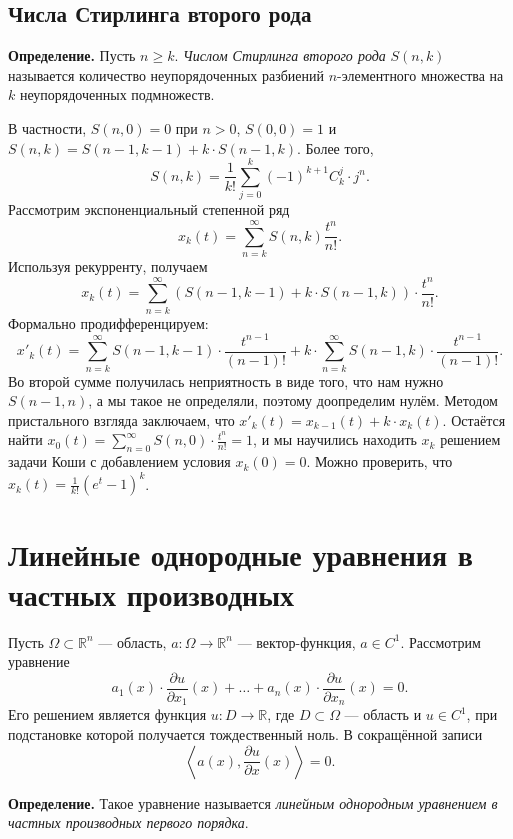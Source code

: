 \subsection{Числа Стирлинга второго рода}
\textbf{Определение.} Пусть $n \ge k$. \textit{Числом Стирлинга второго рода} $S(n, k)$ называется количество неупорядоченных разбиений $n$-элементного множества на $k$ неупорядоченных подмножеств.

В частности, $S(n, 0) = 0$ при $n > 0$, $S(0, 0) = 1$ и $S(n, k) = S(n - 1, k - 1) + k \cdot S(n - 1, k)$.
Более того,
\[
    S(n, k) = \frac{1}{k!} \sum_{j=0}^{k} (-1)^{k+1} C_k^j \cdot j^n.
\]
Рассмотрим экспоненциальный степенной ряд
\[
    x_k(t) = \sum_{n=k}^{\infty} S(n, k) \frac{t^n}{n!}.
\]
Используя рекурренту, получаем
\[
    x_k(t) = \sum_{n=k}^{\infty} (S(n - 1, k - 1) + k \cdot S(n - 1, k)) \cdot \frac{t^n}{n!}.
\]
Формально продифференцируем:
\[
    x'_k(t) = \sum_{n=k}^{\infty} S(n - 1, k - 1) \cdot \frac{t^{n-1}}{(n-1)!} + k \cdot \sum_{n=k}^{\infty} S(n - 1, k) \cdot \frac{t^{n-1}}{(n-1)!}.
\]
Во второй сумме получилась неприятность в виде того, что нам нужно $S(n - 1, n)$, а мы такое не определяли, поэтому доопределим нулём.
Методом пристального взгляда заключаем, что $x'_k(t) = x_{k-1}(t) + k \cdot x_k(t)$.
Остаётся найти $x_0(t) = \sum_{n = 0}^{\infty} S(n, 0) \cdot \frac{t^n}{n!} = 1$, и мы научились находить $x_k$ решением задачи Коши с добавлением условия $x_k(0) = 0$.
Можно проверить, что $x_k(t) = \frac{1}{k!} (e^t - 1)^k$.

\setcounter{equation}{0}
\section{Линейные однородные уравнения в частных производных}
Пусть $\Omega \subset \mathbb R^n$ --- область, $a: \Omega \to \mathbb R^n$ --- вектор-функция, $a \in C^1$.
Рассмотрим уравнение
\begin{equation}
    a_1(x) \cdot \frac{\partial u}{\partial x_1}(x) + \dots + a_n(x) \cdot \frac{\partial u}{\partial x_n}(x) = 0.
\end{equation}
Его решением является функция $u: D \to \mathbb R$, где $D \subset \Omega$ --- область и $u \in C^1$, при подстановке которой получается тождественный ноль.
В сокращённой записи
\[
    \left< a(x), \frac{\partial u}{\partial x}(x) \right> = 0.
\]

\textbf{Определение.} Такое уравнение называется \textit{линейным однородным уравнением в частных производных первого порядка}.

